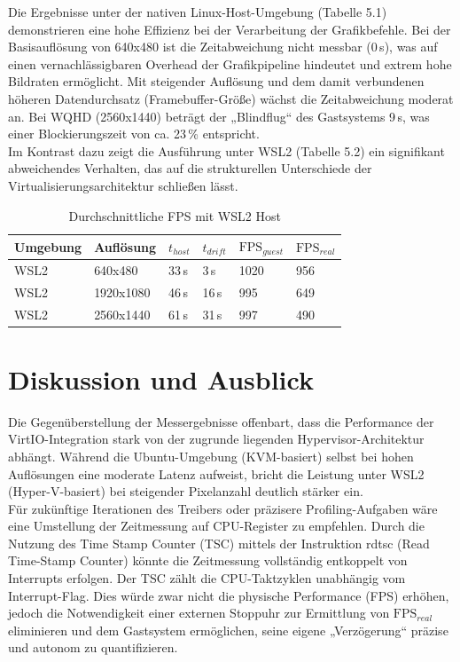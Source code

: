Die Ergebnisse unter der nativen Linux-Host-Umgebung (Tabelle 5.1) demonstrieren eine hohe Effizienz bei der Verarbeitung der Grafikbefehle. Bei der Basisauflösung von 640x480 ist die Zeitabweichung nicht messbar ($0$\,s), was auf einen vernachlässigbaren Overhead der Grafikpipeline hindeutet und extrem hohe Bildraten ermöglicht. Mit steigender Auflösung und dem damit verbundenen höheren Datendurchsatz (Framebuffer-Größe) wächst die Zeitabweichung moderat an. Bei WQHD (2560x1440) beträgt der „Blindflug“ des Gastsystems 9\,s, was einer Blockierungszeit von ca. 23\,\% entspricht.\\

Im Kontrast dazu zeigt die Ausführung unter WSL2 (Tabelle 5.2) ein signifikant abweichendes Verhalten, das auf die strukturellen Unterschiede der Virtualisierungsarchitektur schließen lässt.

\begin{table}[H]
\begin{center}
    \begin{tabular}{| l | l | l | l | l | l |}
    \hline
    Umgebung & Auflösung & $t_{host}$ & $t_{drift}$ & $\mathrm{FPS}_{guest}$ & $\mathrm{FPS}_{real}$ \\ \hline
    WSL2 & 640x480 & 33\,s & 3\,s & 1020 & 956 \\ \hline
    WSL2 & 1920x1080 & 46\,s & 16\,s & 995 & 649 \\ \hline
    WSL2 & 2560x1440 & 61\,s & 31\,s & 997 & 490 \\ \hline
    \end{tabular}
\end{center}
\caption{Durchschnittliche FPS mit WSL2 Host}
\label{tabelle_avarage_time}
\end{table}

\clearpage

\section{Diskussion und Ausblick}

Die Gegenüberstellung der Messergebnisse offenbart, dass die Performance der VirtIO-Integration stark von der zugrunde liegenden Hypervisor-Architektur abhängt. Während die Ubuntu-Umgebung (KVM-basiert) selbst bei hohen Auflösungen eine moderate Latenz aufweist, bricht die Leistung unter WSL2 (Hyper-V-basiert) bei steigender Pixelanzahl deutlich stärker ein.\\

Für zukünftige Iterationen des Treibers oder präzisere Profiling-Aufgaben wäre eine Umstellung der Zeitmessung auf CPU-Register zu empfehlen. Durch die Nutzung des Time Stamp Counter (TSC) mittels der Instruktion rdtsc (Read Time-Stamp Counter) könnte die Zeitmessung vollständig entkoppelt von Interrupts erfolgen. Der TSC zählt die CPU-Taktzyklen unabhängig vom Interrupt-Flag. Dies würde zwar nicht die physische Performance (FPS) erhöhen, jedoch die Notwendigkeit einer externen Stoppuhr zur Ermittlung von $\mathrm{FPS}_{real}$ eliminieren und dem Gastsystem ermöglichen, seine eigene „Verzögerung“ präzise und autonom zu quantifizieren.\\

